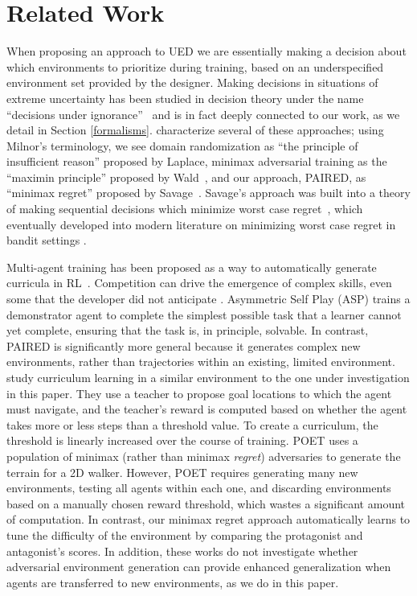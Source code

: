 \documentclass{article}
\begin{document}
\section{Related Work}
When proposing an approach to UED we are essentially making a decision about which environments to prioritize during training, based on an underspecified environment set provided by the designer.  Making decisions in situations of extreme uncertainty has been studied in decision theory under the name ``decisions under ignorance''~\citep{peterson2017introduction} and is in fact deeply connected to our work, as we detail in Section \ref{formalisms}. \citet{milnor1954chapter} characterize several of these approaches; 
using Milnor's terminology, we see domain randomization \citep{jakobi1997evolutionary} as ``the principle of insufficient reason'' proposed by Laplace, minimax adversarial training \citep{khirodkar2018vadra} as the ``maximin principle'' proposed by Wald~\citep{wald1950statistical}, and our approach, PAIRED, as ``minimax regret'' proposed by Savage~\citep{savage1951theory}. Savage's approach was built into a theory of making sequential decisions which minimize worst case regret~\citep{robbins1952some, lai1985asymptotically}, which eventually developed into modern literature on minimizing worst case regret in bandit settings \citep{bubeck2012regret}.

Multi-agent training has been proposed as a way to automatically generate curricula in RL~\citep{leibo2019autocurricula,matiisen2019teacher,graves2017automated}. Competition can drive the emergence of complex skills, even some that the developer did not anticipate \citep{baker2019emergent,gleave2019adversarial}. Asymmetric Self Play (ASP) \citep{sukhbaatar2017intrinsic} trains a demonstrator agent to complete the simplest possible task that a learner cannot yet complete, ensuring that the task is, in principle, solvable. In contrast, PAIRED is significantly more general because it generates complex new environments, rather than trajectories within an existing, limited environment. \citet{campero2020learning} study curriculum learning in a similar environment to the one under investigation in this paper. They use a teacher to propose goal locations to which the agent must navigate, and the teacher's reward is computed based on whether the agent takes more or less steps than a threshold value. To create a curriculum, the threshold is linearly increased over the course of training. POET \citep{wang2019paired,wang2020enhanced} 
uses a population of minimax (rather than minimax \emph{regret}) adversaries to generate the terrain for a 2D walker. 
However, POET \cite{wang2019paired} requires generating many new environments, testing all agents within each one, and discarding environments based on a manually chosen reward threshold, which wastes a significant amount of computation. 
In contrast, our minimax regret approach automatically learns to tune the difficulty of the environment by comparing the protagonist and antagonist's scores. In addition, these works do not investigate whether adversarial environment generation can provide enhanced generalization when agents are transferred to new environments, as we do in this paper. 
\end{document}
